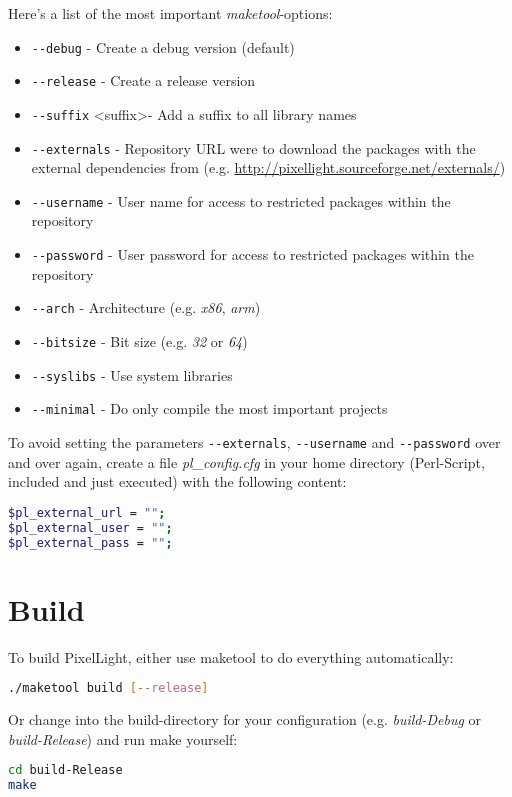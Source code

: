 Here's a list of the most important \emph{maketool}-options:
\begin{itemize}
\item{\verb+--debug+								- Create a debug version (default)}
\item{\verb+--release+								- Create a release version}
\item{\verb+--suffix+ \textless suffix\textgreater	- Add a suffix to all library names}
\item{\verb+--externals+							- Repository \ac{URL} were to download the packages with the external dependencies from (e.g. \url{http://pixellight.sourceforge.net/externals/})}
\item{\verb+--username+								- User name for access to restricted packages within the repository}
\item{\verb+--password+								- User password for access to restricted packages within the repository}
\item{\verb+--arch+									- Architecture (e.g. \emph{x86}, \emph{arm})}
\item{\verb+--bitsize+								- Bit size (e.g. \emph{32} or \emph{64})}
\item{\verb+--syslibs+								- Use system libraries}
\item{\verb+--minimal+								- Do only compile the most important projects}
\end{itemize}

To avoid setting the parameters \verb+--externals+, \verb+--username+ and \verb+--password+ over and over again, create a file \emph{pl\_config.cfg} in your home directory (Perl-Script, included and just executed) with the following content:
\begin{lstlisting}[language=sh]
$pl_external_url = "";
$pl_external_user = "";
$pl_external_pass = "";
\end{lstlisting}




\section{Build}
\label{Chapter:Linux_Build}
To build PixelLight, either use maketool to do everything automatically:
\begin{lstlisting}[language=sh]
./maketool build [--release]
\end{lstlisting}

Or change into the build-directory for your configuration (e.g. \emph{build-Debug} or \emph{build-Release}) and run make yourself:
\begin{lstlisting}[language=sh]
cd build-Release
make
\end{lstlisting}

